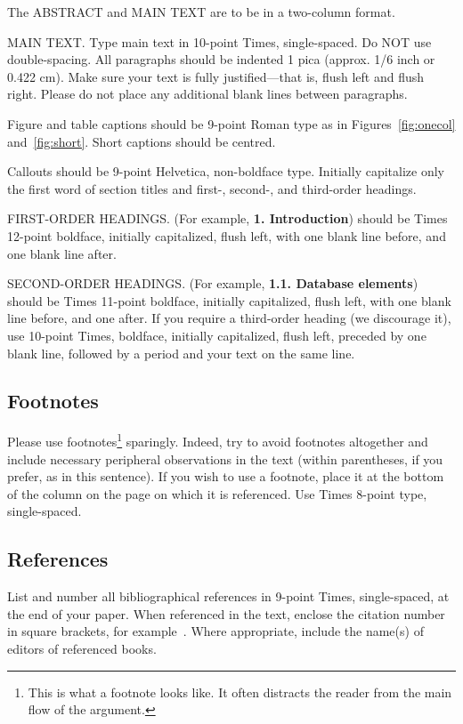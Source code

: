 The ABSTRACT and MAIN TEXT are to be in a two-column format.

MAIN TEXT.
Type main text in 10-point Times, single-spaced.
Do NOT use double-spacing.
All paragraphs should be indented 1 pica (approx. 1/6 inch or 0.422 cm).
Make sure your text is fully justified---that is, flush left and flush right. Please do not place any additional blank lines between paragraphs.

Figure and table captions should be 9-point Roman type as in Figures~\ref{fig:onecol} and~\ref{fig:short}.
Short captions should be centred.

\noindent Callouts should be 9-point Helvetica, non-boldface type.
Initially capitalize only the first word of section titles and first-, second-, and third-order headings.

FIRST-ORDER HEADINGS.
(For example, {\large \bf 1. Introduction}) should be Times 12-point boldface, initially capitalized, flush left, with one blank line before, and one blank line after.

SECOND-ORDER HEADINGS.
(For example, { \bf 1.1. Database elements}) should be Times 11-point boldface, initially capitalized, flush left, with one blank line before, and one after.
If you require a third-order heading (we discourage it), use 10-point Times, boldface, initially
capitalized, flush left, preceded by one blank line, followed by a period and your text on the same line.

\subsection{Footnotes}

Please use footnotes\footnote {This is what a footnote looks like. It
often distracts the reader from the main flow of the argument.} sparingly.
Indeed, try to avoid footnotes altogether and include necessary peripheral observations in the text (within parentheses, if you prefer, as in this sentence).
If you wish to use a footnote, place it at the bottom of the column on the page on which it is referenced.
Use Times 8-point type, single-spaced.

\subsection{References}

List and number all bibliographical references in 9-point Times, single-spaced, at the end of your paper.
When referenced in the text, enclose the citation number in square brackets, for example~\cite{Authors14}.
Where appropriate, include the name(s) of editors of referenced books.

